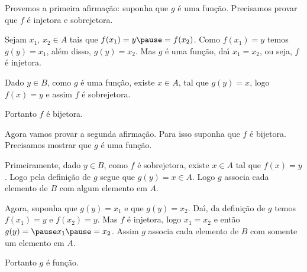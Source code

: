 \documentclass{beamer}
\begin{document}
    \begin{frame}
        Provemos a primeira afirma\c{c}\~ao: \pause suponha que $g$ \'e uma fun\c{c}\~ao. \pause Precisamos provar que $f$ {\'e} injetora \pause e sobrejetora.\pause

        \vspace{.5cm}

        Sejam $x_1$, \pause $x_2 \in A$ \pause  tais que $f(x_1) = y \pause = f(x_2)$. \pause Como $f(x_1) = y$ \pause temos $g(y) = x_1$, \pause al{\'e}m disso, \pause $g(y) = x_2$. \pause Mas $g$ {\'e} uma fun{\c c}{\~a}o, \pause da{\'\i} $x_1 = x_2$, \pause ou seja, \pause $f$ {\'e} injetora.\pause
        
        \vspace{.5cm}

        Dado $y \in B$, \pause como $g$ {\'e} uma fun{\c c}{\~a}o, \pause existe $x \in A$, \pause tal que $g(y) = x$, \pause logo $f(x) = y$ \pause e assim $f$ {\'e} sobrejetora.\pause

        \vspace{.5cm}

        Portanto $f$ {\'e} bijetora.\pause
    \end{frame}

    \begin{frame}

        Agora vamos provar a segunda afirma\c{c}\~ao. \pause Para isso suponha que $f$ \'e bijetora. \pause Precisamos mostrar que $g$ \'e uma fun\c{c}\~ao. \pause

        \vspace{.5cm}

        Primeiramente, \pause dado $y \in B$, \pause como $f$ {\'e} sobrejetora, \pause existe $x \in A$ \pause tal que $f(x) = y$. \pause Logo pela defini\c{c}\~ao de $g$ \pause segue que $g(y) = x \in A$. \pause Logo $g$ associa cada elemento de $B$ \pause com algum elemento em $A$.\pause

        \vspace{.5cm}

        Agora, suponha que $g(y) = x_1$ \pause e que $g(y) = x_2$. \pause Da{\'\i}, da defini\c{c}\~ao de $g$ \pause  temos $f(x_1) = y$ \pause e $f(x_2) = y$. \pause Mas $f$ {\'e} injetora, \pause logo $x_1 = x_2$ \pause e ent{\~a}o $g(y) = \pause x_1 \pause = x_2$. \pause Assim $g$ associa cada elemento de $B$ \pause com somente um elemento em $A$.\pause

        \vspace{.5cm}

        Portanto $g$ {\'e} fun{\c c}{\~a}o.\pause
    \end{frame}
\end{document}
